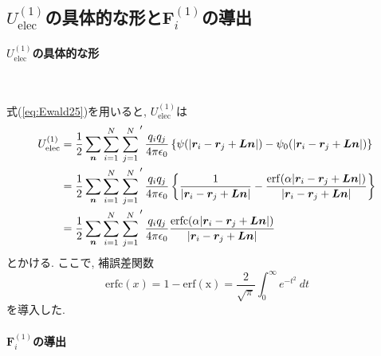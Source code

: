 \subsection{$U_{\mathrm{elec}}^{(1)}$の具体的な形と$\bm{F}_{i}^{(1)}$の導出}
\paragraph{$U_{\mathrm{elec}}^{(1)}$の具体的な形} \

式(\ref{eq:Ewald25})を用いると, $U_{\mathrm{elec}}^{(1)}$は
\begin{align}
    U_{\mathrm{elec}}^{(1)}
 &=
    \frac{1}{2} \sum_{\bm{n}} \sum_{i=1}^{N} \left.\sum_{j=1}^{N}\right.^{\prime}
    \frac{q_{i}q_{j}}{4 \pi \epsilon_{0}}
    \left\{
            \psi( |\bm{r}_{i} - \bm{r}_{j} + \bm{Ln}| )
           -\psi_{0}( |\bm{r}_{i} - \bm{r}_{j} + \bm{Ln}| )
    \right\}
 \notag
 \\
 &=
    \frac{1}{2} \sum_{\bm{n}} \sum_{i=1}^{N} \left.\sum_{j=1}^{N}\right.^{\prime}
    \frac{q_{i}q_{j}}{4 \pi \epsilon_{0}}
    \left\{
            \frac{1}{|\bm{r}_{i} - \bm{r}_{j} + \bm{Ln}|}
           -\frac{\mathrm{erf}(\alpha |\bm{r}_{i} - \bm{r}_{j} + \bm{Ln}| )}
                 {|\bm{r}_{i} - \bm{r}_{j} + \bm{Ln}|}
    \right\}
 \notag
 \\
 &=
    \frac{1}{2} \sum_{\bm{n}} \sum_{i=1}^{N} \left.\sum_{j=1}^{N}\right.^{\prime}
    \frac{q_{i}q_{j}}{4 \pi \epsilon_{0}}
    \frac{\mathrm{erfc}(\alpha |\bm{r}_{i} - \bm{r}_{j} + \bm{Ln}| )}
         {|\bm{r}_{i} - \bm{r}_{j} + \bm{Ln}|}
 \label{eq:Ewald26}
\end{align}
とかける. ここで, 補誤差関数
\begin{equation}
    \mathrm{erfc}(x)
  =
    1 - \mathrm{erf(x)}
  =
  \frac{2}{\sqrt{\pi}} \int^{\infty}_{0} e^{-t^{2}} ~dt
 \label{eq:Ewald27}
\end{equation}
を導入した.

\paragraph{$\bm{F}_{i}^{(1)}$の導出} \


